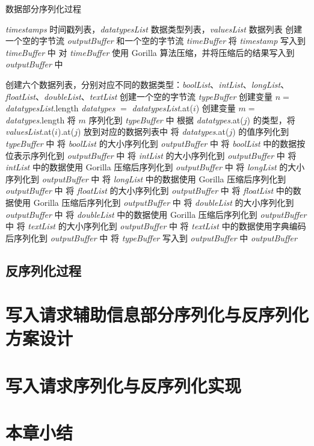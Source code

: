 \begin{algorithm}
  \caption{数据部分序列化过程}
  \label{alg:value-encoding}
  \small
  \begin{algorithmic}
    \REQUIRE \emph{timestamps} 时间戳列表，\emph{datatypesList} 数据类型列表，\emph{valuesList} 数据列表 
    \STATE 创建一个空的字节流 \emph{outputBuffer} 和一个空的字节流 \emph{timeBuffer}
      \STATE 将 \emph{timestamp} 写入到 \emph{timeBuffer} 中
    \ENDFOR
    \STATE 对 \emph{timeBuffer} 使用 Gorilla 算法压缩，并将压缩后的结果写入到 \emph{outputBuffer} 中 

    \STATE 创建六个数据列表，分别对应不同的数据类型：\emph{boolList}、\emph{intList}、\emph{longList}、\emph{floatList}、\emph{doubleList}、\emph{textList}
    \STATE 创建一个空的字节流 \emph{typeBuffer}
    \STATE 创建变量 $n = $\emph{datatypesList}.length
      \STATE \emph{datatypes} $=$ \emph{datatypesList}.at($i$)
      \STATE 创建变量 $m = $\emph{datatypes}.length
      \STATE 将 $m$ 序列化到 \emph{typeBuffer} 中
        \STATE 根据 \emph{datatypes}.at($j$) 的类型，将 \emph{valuesList}.at($i$).at($j$) 放到对应的数据列表中
        \STATE 将 \emph{datatypes}.at($j$) 的值序列化到 \emph{typeBuffer} 中
      \ENDFOR
    \ENDFOR
    \STATE 将 \emph{boolList} 的大小序列化到 \emph{outputBuffer} 中
    \STATE 将 \emph{boolList} 中的数据按位表示序列化到 \emph{outputBuffer} 中
    \STATE 将 \emph{intList} 的大小序列化到 \emph{outputBuffer} 中
    \STATE 将 \emph{intList} 中的数据使用 Gorilla 压缩后序列化到 \emph{outputBuffer} 中
    \STATE 将 \emph{longList} 的大小序列化到 \emph{outputBuffer} 中
    \STATE 将 \emph{longList} 中的数据使用 Gorilla 压缩后序列化到 \emph{outputBuffer} 中
    \STATE 将 \emph{floatList} 的大小序列化到 \emph{outputBuffer} 中
    \STATE 将 \emph{floatList} 中的数据使用 Gorilla 压缩后序列化到 \emph{outputBuffer} 中
    \STATE 将 \emph{doubleList} 的大小序列化到 \emph{outputBuffer} 中
    \STATE 将 \emph{doubleList} 中的数据使用 Gorilla 压缩后序列化到 \emph{outputBuffer} 中
    \STATE 将 \emph{textList} 的大小序列化到 \emph{outputBuffer} 中
    \STATE 将 \emph{textList} 中的数据使用字典编码后序列化到 \emph{outputBuffer} 中
    \STATE 将 \emph{typeBuffer} 写入到 \emph{outputBuffer} 中
    \RETURN \emph{outputBuffer}

  \end{algorithmic}
\end{algorithm}
\subsection{反序列化过程}


\section{写入请求辅助信息部分序列化与反序列化方案设计}
\section{写入请求序列化与反序列化实现}
\section{本章小结}